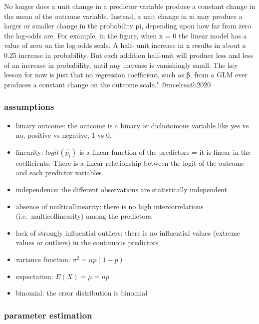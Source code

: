 \documentclass[
]{article}
\begin{document}
No longer does a unit change in a predictor variable produce a constant
change in the mean of the outcome variable. Instead, a unit change in xi
may produce a larger or smaller change in the probability pi, depending
upon how far from zero the log-odds are. For example, in the figure,
when x = 0 the linear model has a value of zero on the log-odds scale. A
half- unit increase in x results in about a 0.25 increase in
probability. But each addition half-unit will produce less and less of
an increase in probability, until any increase is vanishingly small. The
key lesson for now is just that no regression coefficient, such as β,
from a GLM ever produces a constant change on the outcome scale."
@mcelreath2020

\hypertarget{assumptions-1}{%
\subsubsection{assumptions}\label{assumptions-1}}

\begin{itemize}
\item
  binary outcome: the outcome is a binary or dichotomous variable like
  yes vs no, positive vs negative, 1 vs 0.
\item
  linearity: \(logit(\hat{p_i})\) is a linear function of the predictors
  = it is linear in the coefficients. There is a linear relationship
  between the logit of the outcome and each predictor variables.
\item
  independence: the different observations are statistically independent
\item
  absence of multicollinearity: there is no high intercorrelations
  (i.e.~multicollinearity) among the predictors.
\item
  lack of strongly influential outliers: there is no influential values
  (extreme values or outliers) in the continuous predictors
\item
  variance function: \(\sigma^2 = np(1-p)\)
\item
  expectation: \(E(X)= \mu= np\)
\item
  binomial: the error distribution is binomial
\end{itemize}

\hypertarget{parameter-estimation-1}{%
\subsubsection{parameter estimation}\label{parameter-estimation-1}}
\end{document}
